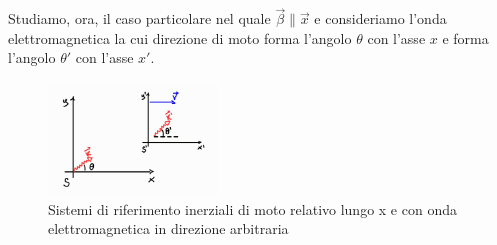 Studiamo, ora, il caso particolare nel quale $\Vec{\beta}\parallel\Vec{x}$ e consideriamo l'onda elettromagnetica la cui direzione di moto forma l'angolo $\theta$ con l'asse $x$ e forma l'angolo $\theta'$ con l'asse $x'$.
\begin{figure}[h]
    \centering
    \includegraphics[width=0.40\textwidth]{Immagini/Doppler_unidirezionale .jpg}
    \caption{ Sistemi di riferimento inerziali di moto relativo lungo x e con onda elettromagnetica in direzione arbitraria }
    \label{fig:Doppler_x}
\end{figure}

